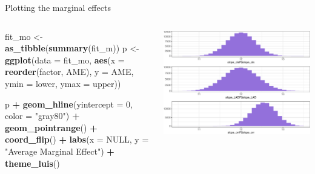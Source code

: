 \documentclass[australian,ignorenonframetext,aspectratio=169]{beamer}
\newenvironment{Shaded}{\begin{snugshade}}{\end{snugshade}}
\newcommand{\DataTypeTok}[1]{\textcolor[rgb]{0.13,0.29,0.53}{#1}}
\newcommand{\DecValTok}[1]{\textcolor[rgb]{0.00,0.00,0.81}{#1}}
\newcommand{\KeywordTok}[1]{\textcolor[rgb]{0.13,0.29,0.53}{\textbf{#1}}}
\newcommand{\NormalTok}[1]{#1}
\newcommand{\OperatorTok}[1]{\textcolor[rgb]{0.81,0.36,0.00}{\textbf{#1}}}
\newcommand{\OtherTok}[1]{\textcolor[rgb]{0.56,0.35,0.01}{#1}}
\newcommand{\StringTok}[1]{\textcolor[rgb]{0.31,0.60,0.02}{#1}}
\begin{document}
\begin{frame}[fragile]{Plotting the marginal effects}
\protect\hypertarget{plotting-the-marginal-effects}{}

\begin{columns}[T]
\begin{column}{0.5\textwidth}
\tiny

\begin{Shaded}
\begin{Highlighting}[]
\NormalTok{fit\_mo \textless{}{-}}\StringTok{ }\KeywordTok{as\_tibble}\NormalTok{(}\KeywordTok{summary}\NormalTok{(fit\_m))}
\NormalTok{p \textless{}{-}}\StringTok{ }\KeywordTok{ggplot}\NormalTok{(}\DataTypeTok{data =}\NormalTok{ fit\_mo, }\KeywordTok{aes}\NormalTok{(}\DataTypeTok{x =} \KeywordTok{reorder}\NormalTok{(factor, AME),}
                              \DataTypeTok{y =}\NormalTok{ AME, }\DataTypeTok{ymin =}\NormalTok{ lower, }\DataTypeTok{ymax =}\NormalTok{ upper))}

\NormalTok{p }\OperatorTok{+}\StringTok{ }\KeywordTok{geom\_hline}\NormalTok{(}\DataTypeTok{yintercept =} \DecValTok{0}\NormalTok{, }\DataTypeTok{color =} \StringTok{"gray80"}\NormalTok{) }\OperatorTok{+}
\StringTok{    }\KeywordTok{geom\_pointrange}\NormalTok{() }\OperatorTok{+}\StringTok{ }\KeywordTok{coord\_flip}\NormalTok{() }\OperatorTok{+}
\StringTok{    }\KeywordTok{labs}\NormalTok{(}\DataTypeTok{x =} \OtherTok{NULL}\NormalTok{, }\DataTypeTok{y =} \StringTok{"Average Marginal Effect"}\NormalTok{) }\OperatorTok{+}\StringTok{ }
\StringTok{    }\KeywordTok{theme\_luis}\NormalTok{()}
\end{Highlighting}
\end{Shaded}
\end{column}

\begin{column}{0.5\textwidth}
\includegraphics{../graphs/unnamed-chunk-29-1.pdf}
\end{column}
\end{columns}

\end{frame}
\end{document}

